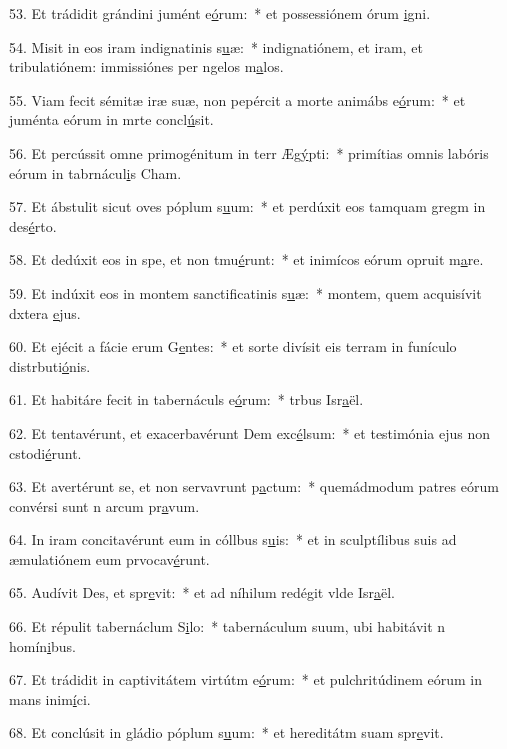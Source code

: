 53. Et trádidit grándini jumént e\uline{ó}rum:~* et possessiónem órum \uline{i}gni.\par 
54. Misit in eos iram indignatinis s\uline{u}æ:~* indignatiónem, et iram, et tribulatiónem: immissiónes per ngelos m\uline{a}los.\par 
55. Viam fecit sémitæ iræ suæ, non pepércit a morte animábs e\uline{ó}rum:~* et juménta eórum in mrte concl\uline{ú}sit.\par 
56. Et percússit omne primogénitum in terr Æg\uline{ý}pti:~* primítias omnis labóris eórum in tabrnácul\uline{i}s Cham.\par 
57. Et ábstulit sicut oves póplum s\uline{u}um:~* et perdúxit eos tamquam gregm in des\uline{é}rto.\par 
58. Et dedúxit eos in spe, et non tmu\uline{é}runt:~* et inimícos eórum opruit m\uline{a}re.\par 
59. Et indúxit eos in montem sanctificatinis s\uline{u}æ:~* montem, quem acquisívit dxtera \uline{e}jus.\par 
60. Et ejécit a fácie erum G\uline{e}ntes:~* et sorte divísit eis terram in funículo distrbuti\uline{ó}nis.\par 
61. Et habitáre fecit in tabernáculs e\uline{ó}rum:~* trbus Isr\uline{a}ël.\par 
62. Et tentavérunt, et exacerbavérunt Dem exc\uline{é}lsum:~* et testimónia ejus non cstodi\uline{é}runt.\par 
63. Et avertérunt se, et non servavrunt p\uline{a}ctum:~* quemádmodum patres eórum convérsi sunt n arcum pr\uline{a}vum.\par 
64. In iram concitavérunt eum in cóllbus s\uline{u}is:~* et in sculptílibus suis ad æmulatiónem eum prvocav\uline{é}runt.\par 
65. Audívit Des, et spr\uline{e}vit:~* et ad níhilum redégit vlde Isr\uline{a}ël.\par 
66. Et répulit tabernáclum S\uline{i}lo:~* tabernáculum suum, ubi habitávit n homín\uline{i}bus.\par 
67. Et trádidit in captivitátem virtútm e\uline{ó}rum:~* et pulchritúdinem eórum in mans inim\uline{í}ci.\par 
68. Et conclúsit in gládio póplum s\uline{u}um:~* et hereditátm suam spr\uline{e}vit.\par 
